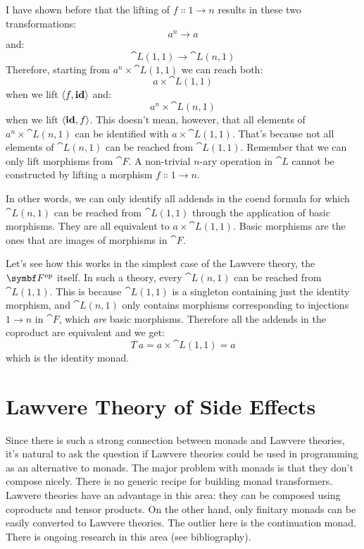 \begin{figure}[H]
\centering
{}
\end{figure}

\noindent
I have shown before that the lifting of
$f \Colon 1 \to n$ results in these two
transformations:
\[a^n \to a\]
and:
\[\cat{L}(1, 1) \to \cat{L}(n, 1)\]
Therefore, starting from $a^n \times \cat{L}(1, 1)$ we can reach both:
\[a \times \cat{L}(1, 1)\]
when we lift $\langle f, \mathbf{id} \rangle$ and:
\[a^n \times \cat{L}(n, 1)\]
when we lift $\langle \mathbf{id}, f \rangle$. This doesn't
mean, however, that all elements of $a^n \times \cat{L}(n, 1)$ can be
identified with $a × \cat{L}(1, 1)$. That's because not all elements
of $\cat{L}(n, 1)$ can be reached from $\cat{L}(1, 1)$. Remember
that we can only lift morphisms from $\cat{F}$. A non-trivial $n$-ary
operation in $\cat{L}$ cannot be constructed by lifting a morphism
$f \Colon 1 \to n$.

In other words, we can only identify all addends in the coend formula
for which $\cat{L}(n, 1)$ can be reached from $\cat{L}(1, 1)$
through the application of basic morphisms. They are all equivalent to
$a \times \cat{L}(1, 1)$. Basic morphisms are the ones that are images of
morphisms in $\cat{F}$.

Let's see how this works in the simplest case of the Lawvere theory, the
$\Fop$ itself. In such a theory, every
$\cat{L}(n, 1)$ can be reached from $\cat{L}(1, 1)$. This is because
$\cat{L}(1, 1)$ is a singleton containing just the identity morphism,
and $\cat{L}(n, 1)$ only contains morphisms corresponding to
injections $1 \to n$ in $\cat{F}$, which \emph{are}
basic morphisms. Therefore all the addends in the coproduct are
equivalent and we get:
\[T\ a = a \times \cat{L}(1, 1) = a\]
which is the identity monad.

\section{Lawvere Theory of Side Effects}

Since there is such a strong connection between monads and Lawvere
theories, it's natural to ask the question if Lawvere theories could be
used in programming as an alternative to monads. The major problem with
monads is that they don't compose nicely. There is no generic recipe for
building monad transformers. Lawvere theories have an advantage in this
area: they can be composed using coproducts and tensor products. On the
other hand, only finitary monads can be easily converted to Lawvere
theories. The outlier here is the continuation monad. There is ongoing
research in this area (see bibliography).

